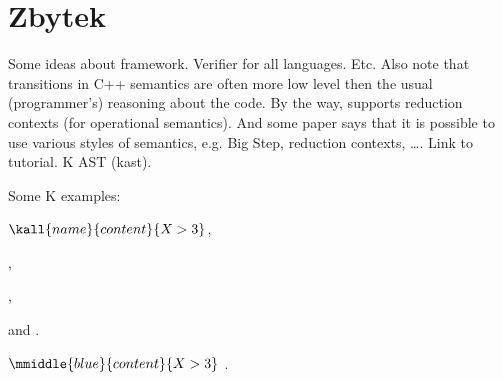 \documentclass{fithesis3}
\begin{document}
\chapter{Zbytek}

Some ideas about \K framework. Verifier for all languages. Etc. Also note that transitions in C++ semantics are often more low level then the usual (programmer's) reasoning about the code. By the way, \K supports reduction contexts (for operational semantics). And some \K paper says that it is possible to use various styles of semantics, e.g. Big Step, reduction contexts, \ldots . Link to \K tutorial. K AST (kast).

\ifshowkexamples
Some K examples:

$\kall{name}{content}{X > 3}$,

,

,

and .

$\mmiddle{blue}{content}{X > 3}$
.

\fi
\end{document}

